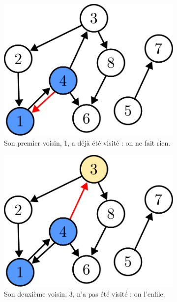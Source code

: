 \documentclass{article}
\begin{document}
\begin{itemize}
\begin{figure}[b]
		\begin{subfigure}[t]{0.3\linewidth}
			\centering
			\includegraphics[width=0.9\linewidth]{../figures/bfs4.pdf}
			\caption{Son premier voisin, 1, a déjà été visité : on ne fait rien.}
		\end{subfigure}\hfill%
		\begin{subfigure}[t]{0.3\linewidth}
			\centering
			\includegraphics[width=0.9\linewidth]{../figures/bfs5.pdf}
			\caption{Son deuxième voisin, 3, n'a pas été visité : on l'enfile.}
		\end{subfigure}\hfill%
		\begin{subfigure}[t]{0.3\linewidth}
			\centering

\end{subfigure}
\end{figure}
\end{itemize}
\end{document}
